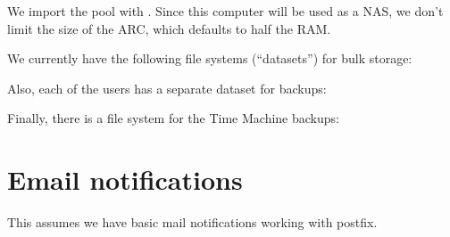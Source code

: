 \documentclass[a4paper,10pt,english]{sphinxmanual}
\begin{document}
We import the pool with . Since this computer will be
used as a NAS, we don’t limit the size of the ARC, which defaults to half the
RAM.

\begin{sphinxVerbatim}[commandchars=\\\{\}]
  
\end{sphinxVerbatim}

We currently have the following file systems (“datasets”) for bulk storage:

\begin{sphinxVerbatim}[commandchars=\\\{\}]
\end{sphinxVerbatim}

Also, each of the users has a separate dataset for backups:

\begin{sphinxVerbatim}[commandchars=\\\{\}]
\end{sphinxVerbatim}

Finally, there is a file system for the Time Machine backups:

\begin{sphinxVerbatim}[commandchars=\\\{\}]
\end{sphinxVerbatim}


\section{Email notifications}
\label{\detokenize{zfs:email-notifications}}
This assumes we have basic mail notifications working with postfix.

\begin{sphinxVerbatim}[commandchars=\\\{\}]
  
\end{sphinxVerbatim}
\end{document}
